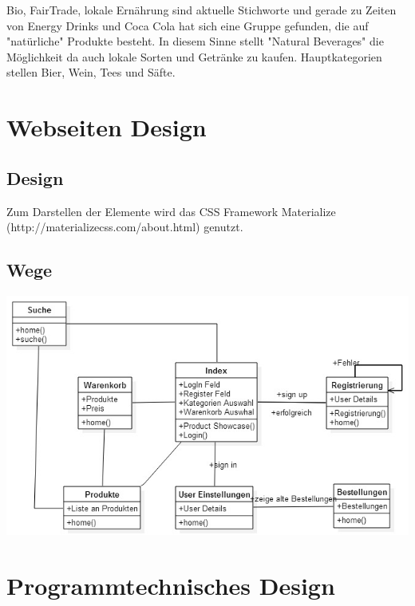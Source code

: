\documentclass[a4paper, 11pt]{article}
\begin{document}
Bio, FairTrade, lokale Ernährung sind aktuelle Stichworte und gerade zu Zeiten von Energy Drinks und Coca Cola hat sich eine Gruppe gefunden, die auf "natürliche" Produkte besteht. In diesem Sinne stellt "Natural Beverages" die Möglichkeit da auch lokale Sorten und Getränke zu kaufen. Hauptkategorien stellen Bier, Wein, Tees und Säfte.  
\section{Webseiten Design}

\subsection{Design}
Zum Darstellen der Elemente wird das CSS Framework Materialize (http://materializecss.com/about.html) genutzt. 

\subsection{Wege}
\includegraphics[width=\textwidth]{websiteWege.jpg}
\section{Programmtechnisches Design}
\end{document}
